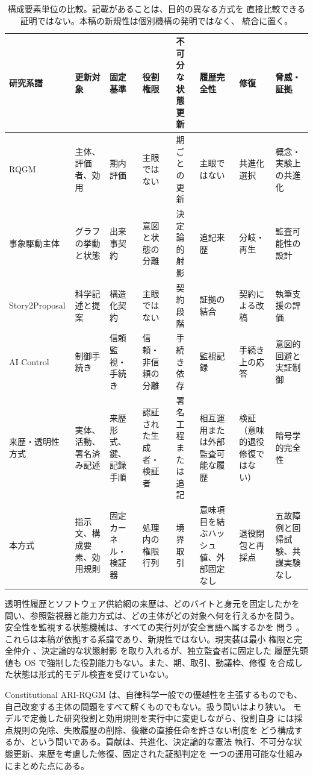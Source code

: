 \begin{table}[t]
  \centering
  \scriptsize
  \begin{tabularx}{\textwidth}{@{}p{}*{7}{X}@{}}
    \toprule
    \textbf{研究系譜} & \textbf{更新対象} & \textbf{固定基準} &
    \textbf{役割権限} & \textbf{不可分な状態更新} &
    \textbf{履歴完全性} & \textbf{修復} & \textbf{脅威・証拠} \\
    \midrule
    RQGM \cite{iacob2026red} & 主体、評価者、効用 &
      期内評価 & 主眼ではない & 期ごとの更新 &
      主眼ではない & 共進化選択 &
      概念・実験上の共進化 \\
    事象駆動主体 \cite{nakajima2026the} & グラフの挙動と状態 &
      出来事契約 & 意図と状態の分離 & 決定論的射影 &
      追記来歴 & 分岐・再生 &
      監査可能性の設計 \\
    Story2Proposal \cite{qian2026story2proposal} & 科学記述と提案 &
      構造化契約 & 主眼ではない & 契約段階 &
      証拠の結合 & 契約による改稿 &
      執筆支援の評価 \\
    AI Control \cite{greenblatt2023ai} & 制御手続き &
      信頼監視・手続き & 信頼・非信頼の分離 &
      手続き依存 & 監視記録 & 手続き上の応答 &
      意図的回避と実証制御 \\
    来歴・透明性方式 & 実体、活動、署名済み記述 &
      来歴形式、鍵、記録手順 & 認証された生成者・検証者 &
      署名工程または追記 & 相互運用または外部監査可能な履歴 &
      検証（意味的退役修復ではない） & 暗号学的完全性 \\
    本方式 & 指示文、構成要素、効用規則 &
      固定カーネル・検証器 & 処理内の権限行列 &
      境界取引 & 意味項目を結ぶハッシュ値、外部固定なし &
      退役閉包と再採点 &
      五故障例と回帰試験、共謀実験なし \\
    \bottomrule
  \end{tabularx}
  \caption{構成要素単位の比較。記載があることは、目的の異なる方式を
    直接比較できる証明ではない。本稿の新規性は個別機構の発明ではなく、
    統合に置く。}
  \label{tab:related-comparison}
\end{table}

透明性履歴とソフトウェア供給網の来歴は、どのバイトと身元を固定したかを
問い、参照監視器と能力方式は、どの主体がどの対象へ何を行えるかを問う。
安全性を監視する状態機械は、すべての実行列が安全言語へ属するかを
問う \cite{schneider2000enforceable}。これらは本稿が依拠する系譜であり、新規性ではない。現実装は最小
権限と完全仲介 \cite{saltzer1975protection}、決定論的な状態射影
\cite{schneider1990implementing} を取り入れるが、独立監査者に固定した
履歴先頭値も OS で強制した役割能力もない。また、期、取引、動議枠、修復
を合成した状態は形式的モデル検査を受けていない。

Constitutional ARI-RQGM は、自律科学一般での優越性を主張するものでも、
自己改変する主体の問題をすべて解くものでもない。扱う問いはより狭い。
モデルで定義した研究役割と効用規則を実行中に変更しながら、役割自身
には採点規則の免除、失敗履歴の削除、後継の直接任命を許さない制度を
どう構成するか、という問いである。貢献は、共進化、決定論的な憲法
執行、不可分な状態更新、来歴を考慮した修復、固定された証拠判定を
一つの運用可能な仕組みにまとめた点にある。
